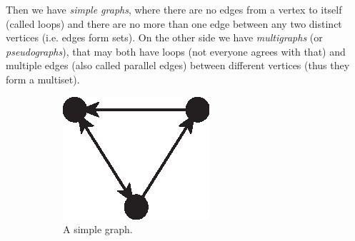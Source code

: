       Then we have \emph{simple graphs}, where there are no edges from a vertex to itself (called loops) and there are no more than one edge between any two distinct vertices (i.e. edges form sets). On the other side we have \emph{multigraphs} (or \emph{pseudographs}), that may both have loops (not everyone agrees with that) and multiple edges (also called parallel edges) between different vertices (thus they form a multiset).
      \begin{figure}[H]
        \centering        
          \begin{subfigure}[b]{0.25\textwidth}
            \includegraphics[width=\textwidth]{chapters/02_problem_definition/graph_simple}
            \caption{A simple graph.}
            \label{fig:graphs_simple}
          \end{subfigure}
          \qquad\qquad\qquad
          \begin{subfigure}[b]{0.25\textwidth}

\end{subfigure}
\end{figure}
